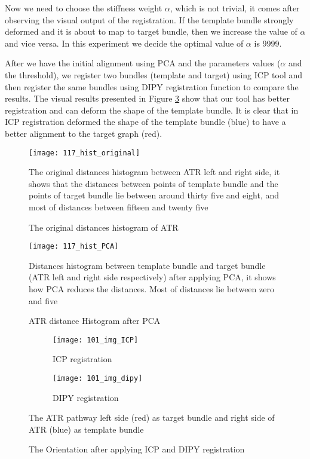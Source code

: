\documentclass[../structure.tex]{subfiles}
\begin{document}
Now we need to choose the stiffness weight $\alpha$, which is not trivial, it comes after observing the visual output of the registration. If the template bundle strongly deformed and it is about to map to target bundle, then we increase the value of $\alpha$ and vice versa. In this experiment we decide the optimal value of $\alpha$ is 9999.

After we have the initial alignment using PCA and the parameters values ($\alpha$ and the threshold), we register two bundles (template and target) using ICP tool and then register the same bundles using DIPY registration function to compare the results. The visual results presented in Figure \ref{fig:registration} show that our tool has better registration and can deform the shape of the template bundle. It is clear that in ICP registration  deformed the shape of the template bundle (blue) to have a better alignment to the target graph (red).

\begin{figure}[H]
\centering
\texttt{[image: 117\_hist\_original]}
\captionsetup{justification=centering}
\caption{The original distances histogram of ATR}%
{The original distances histogram between ATR left and right side, it shows that the distances between points of template bundle and the points of target bundle lie between around thirty five and eight, and most of distances between fifteen and twenty five}
\label{fig:hist_original}
\end{figure}

\begin{figure}[H]
\centering
\texttt{[image: 117\_hist\_PCA]}
\captionsetup{justification=centering}
\caption{ATR distance Histogram after PCA}
{Distances histogram between template bundle and target bundle (ATR left and right side respectively) after applying PCA, it shows how PCA reduces the distances. Most of distances lie between zero and five}
\label{fig:hist_PCA}
\end{figure}

\begin{figure}[H]
	\centering
	\begin{subfigure}[b]{0.49\textwidth}
	\texttt{[image: 101\_img\_ICP]}
	\caption{ICP registration}
	\end{subfigure}
	\begin{subfigure}[b]{0.49\textwidth}
	\texttt{[image: 101\_img\_dipy]}
	\caption{DIPY registration}
	\end{subfigure}
\caption{The Orientation after applying ICP and DIPY registration}%
{The ATR pathway left side (red) as target bundle and right side of ATR (blue) as template bundle}
\label{fig:registration}
\end{figure}
\end{document}
